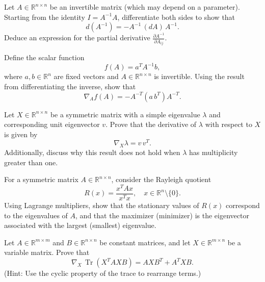 \begin{exercise}
   Let $A \in \mathbb{R}^{n\times n}$ be an invertible matrix (which may depend on a parameter). Starting from the identity $I = A^{-1}A$, differentiate both sides to show that
   \[
      d(A^{-1}) = -A^{-1}\,(dA)\,A^{-1}.
   \]
   Deduce an expression for the partial derivative $\frac{\partial A^{-1}}{\partial A_{ij}}$.
\end{exercise}

\begin{exercise}
   Define the scalar function
   \[
      f(A)=a^T A^{-1} b,
   \]
   where $a,b\in\mathbb{R}^n$ are fixed vectors and $A\in\mathbb{R}^{n\times n}$ is invertible. Using the result from differentiating the inverse, show that
   \[
      \nabla_A f(A) = -A^{-T}(a\,b^T)A^{-T}.
   \]
\end{exercise}

\begin{exercise}
   Let $X\in\mathbb{R}^{n\times n}$ be a symmetric matrix with a simple eigenvalue $\lambda$ and corresponding unit eigenvector $v$. Prove that the derivative of $\lambda$ with respect to $X$ is given by
   \[
      \nabla_X \lambda = v\,v^T.
   \]
   Additionally, discuss why this result does not hold when $\lambda$ has multiplicity greater than one.
\end{exercise}

\begin{exercise}
   For a symmetric matrix $A\in\mathbb{R}^{n\times n}$, consider the Rayleigh quotient
   \[
      R(x) = \frac{x^T A x}{x^T x}, \quad x\in\mathbb{R}^n\setminus\{0\}.
   \]
   Using Lagrange multipliers, show that the stationary values of $R(x)$ correspond to the eigenvalues of $A$, and that the maximizer (minimizer) is the eigenvector associated with the largest (smallest) eigenvalue.
\end{exercise}
\begin{exercise}
   Let $A\in\mathbb{R}^{m\times m}$ and $B\in\mathbb{R}^{n\times n}$ be constant matrices, and let $X\in\mathbb{R}^{m\times n}$ be a variable matrix. Prove that
   \[
      \nabla_X\,\operatorname{Tr}(X^T A X B) = A X B^T + A^T X B.
   \]
   (Hint: Use the cyclic property of the trace to rearrange terms.)
\end{exercise}

